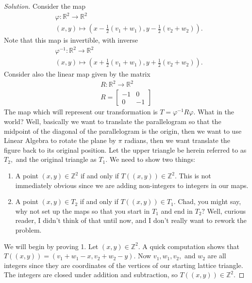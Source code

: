 \documentclass[12pt]{article}
\newcommand{\Z}{\mathbb{Z}}
\newenvironment{exercise}[2][Exercise]{\begin{trivlist}
        \item[\hskip \labelsep {\bfseries #1}\hskip \labelsep {\bfseries #2.}]}{\end{trivlist}}
\newenvironment{solution}
        {\begin{proof}[Solution]}
                    {\end{proof}}
\begin{document}
\begin{exercise}{42}
\begin{solution}
        Consider the map
        \begin{align*}
            &\varphi : \mathbb{R}^{2} \to \mathbb{R}^{2} \\
            &(x,y) \mapsto (x - \frac{1}{2} (v_{1} + w_{1}) , y - \frac{1}{2} (v_{2} + w_{2})) .
        \end{align*}
        Note that this map is invertible, with inverse
        \begin{align*}
            &\varphi^{-1}  : \mathbb{R}^{2} \to \mathbb{R}^{2} \\
            &(x,y) \mapsto (x + \frac{1}{2} (v_{1} + w_{1}) , y + \frac{1}{2} (v_{2} + w_{2})) .
        \end{align*}
        Consider also the linear map given by the matrix
        \begin{align*}
            R : \mathbb{R}^{2} \to \mathbb{R}^{2} \\
            R =
            \begin{bmatrix}
                -1 & 0\\
                0 & -1
            \end{bmatrix}
        \end{align*}
        The map which will represent our transformation is \( T = \varphi^{-1} R \varphi . \) What in the world? Well, basically we want to translate the parallelogram so that the midpoint of the diagonal of the parallelogram is the origin, then we want to use Linear Algebra to rotate the plane by \( \pi \) radians, then we want translate the figure back to its original position. Let the upper triangle be herein referred to as \( T_{2} , \) and the original triangle as \( T_{1} \). We need to show two things:
        \begin{enumerate}
            \item A point \( (x, y) \in \mathbb{Z}^{2} \) if and only if \( T((x ,y)) \in \mathbb{Z}^{2} . \) This is not immediately obvious since we are adding non-integers to integers in our maps.
            \item A point \( (x,y) \in T_{2} \) if and only if \( T((x,y)) \in T_{1} . \) Chad, you might say, why not set up the maps so that you start in \( T_{1} \) and end in \( T_{2} ? \) Well, curious reader, I didn't think of that until now, and I don't really want to rework the problem.
        \end{enumerate}
        We will begin by proving 1. Let \( (x , y) \in \mathbb{Z}^{2} . \) A quick computation shows that \( T((x,y)) = (v_{1} + w_{1} - x, v_{2} + w_{2} - y) . \) Now \( v_{1} ,w_{1} , v_{2} , \) and \( w_{2} \) are all integers since they are coordinates of the vertices of our starting lattice triangle. The integers are closed under addition and subtraction, so \( T((x,y)) \in \Z^{2} . \)


\end{solution}
\end{exercise}
\end{document}
